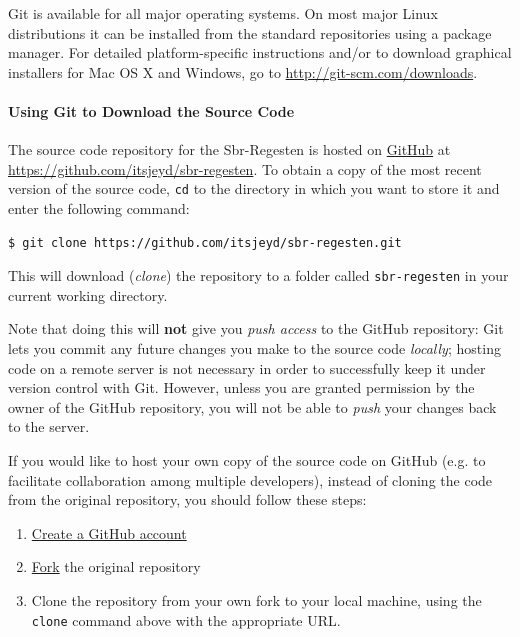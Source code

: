 Git is available for all major operating systems. On most major Linux
distributions it can be installed from the standard repositories using
a package manager. For detailed platform-specific instructions and/or
to download graphical installers for Mac OS X and Windows, go to
\url{http://git-scm.com/downloads}.

\paragraph{Using Git to Download the Source Code}

The source code repository for the Sbr-Regesten is hosted on
\href{https://github.com/}{GitHub} at
\url{https://github.com/itsjeyd/sbr-regesten}. To obtain a copy of the
most recent version of the source code, \texttt{cd} to the directory
in which you want to store it and enter the following command:

\begin{verbatim}
$ git clone https://github.com/itsjeyd/sbr-regesten.git
\end{verbatim}

This will download (\emph{clone}) the repository to a folder called
\texttt{sbr-regesten} in your current working directory.

Note that doing this will \textbf{not} give you \emph{push access} to
the GitHub repository: Git lets you commit any future changes you make
to the source code \emph{locally}; hosting code on a remote server is
not necessary in order to successfully keep it under version control
with Git. However, unless you are granted permission by the owner of
the GitHub repository, you will not be able to \emph{push} your
changes back to the server.

If you would like to host your own copy of the source code on GitHub
(e.g. to facilitate collaboration among multiple developers), instead
of cloning the code from the original repository, you
should follow these steps:

\begin{enumerate}
\item \href{https://github.com/plans}{Create a GitHub account}
\item \href{https://help.github.com/articles/fork-a-repo}{Fork} the
  original repository
\item Clone the repository from your own fork to your local machine,
  using the \texttt{clone} command above with the appropriate URL.
\end{enumerate}

